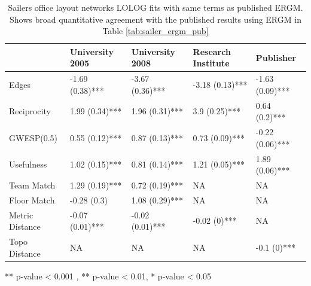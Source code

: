 \documentclass[
]{statsoc}
\begin{document}
\begin{table}

\caption{\label{tab:unnamed-chunk-3}\label{tab:sailer_lolog_pub}Sailers office layout networks LOLOG fits with same terms as published ERGM. Shows broad quantitative agreement with the published results using ERGM in Table \ref{tab:sailer_ergm_pub}}
\centering
\begin{threeparttable}
\begin{tabular}[t]{lllll}
\toprule
  & University 2005 & University 2008 & Research Institute & Publisher\\
\midrule
\rowcolor{gray!6}  Edges & -1.69 (0.38)*** & -3.67 (0.36)*** & -3.18 (0.13)*** & -1.63 (0.09)***\\
Reciprocity & 1.99 (0.34)*** & 1.96 (0.31)*** & 3.9 (0.25)*** & 0.64 (0.2)***\\
\rowcolor{gray!6}  GWESP(0.5) & 0.55 (0.12)*** & 0.87 (0.13)*** & 0.73 (0.09)*** & -0.22 (0.06)***\\
Usefulness & 1.02 (0.15)*** & 0.81 (0.14)*** & 1.21 (0.05)*** & 1.89 (0.06)***\\
\rowcolor{gray!6}  Team Match & 1.29 (0.19)*** & 0.72 (0.19)*** & NA & NA\\
\addlinespace
Floor Match & -0.28 (0.3) & 1.08 (0.29)*** & NA & NA\\
\rowcolor{gray!6}  Metric Distance & -0.07 (0.01)*** & -0.02 (0.01)*** & -0.02 (0)*** & NA\\
Topo Distance & NA & NA & NA & -0.1 (0)***\\
\bottomrule
\end{tabular}
\begin{tablenotes}
\item *** p-value < 0.001 , ** p-value < 0.01, * p-value < 0.05
\end{tablenotes}
\end{threeparttable}
\end{table}
\end{document}
